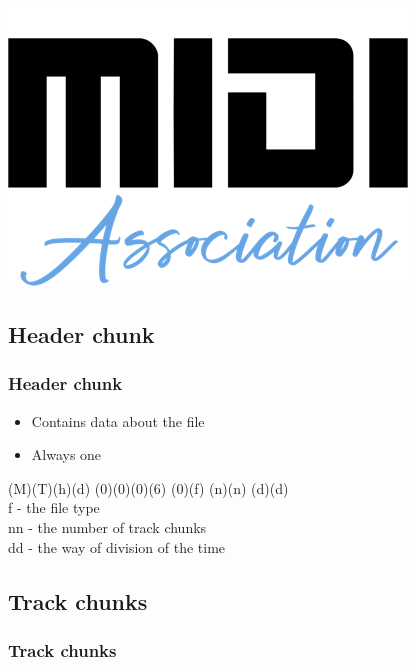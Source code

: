 \documentclass[12pt]{beamer}
\begin{document}
\begin{frame}
\begin{center}
                \includegraphics[scale=0.3]{midiasoc}
            \end{center}
            
        \end{frame}
        \subsection{Header chunk}
        \begin{frame}
            \frametitle{Header chunk}
            \begin{itemize}
                \item Contains data about the file
                \item Always one
            \end{itemize}
            \begin{center}
                {\large (M)(T)(h)(d) (0)(0)(0)(6) (0)(f) (n)(n) (d)(d)} \\ \vspace{0.5cm}
                f - the file type\\
                nn - the number of track chunks\\
                dd - the way of division of the time\\
            \end{center}

        \end{frame}
        \subsection{Track chunks}
        \begin{frame}
            \frametitle{Track chunks}
        \end{frame}
\end{document}
